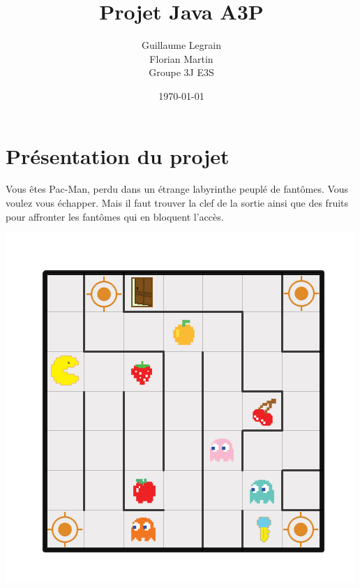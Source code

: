 \documentclass[twoside,french]{report}
\begin{document}
\begin{titlepage}

\title{Projet Java A3P}
\date{\today}
\author{Guillaume Legrain \\
        Florian Martin \\
        Groupe 3J E3S}
\maketitle
\end{titlepage}

\section{Présentation du projet}
Vous êtes Pac-Man, perdu dans un étrange labyrinthe peuplé de fantômes. Vous voulez vous échapper.
Mais il faut trouver la clef de la sortie ainsi que des fruits pour affronter les fantômes qui en
bloquent l’accès.

\includegraphics[scale=0.8]{graphics/Plan-Projet-1.png}
\end{document}
